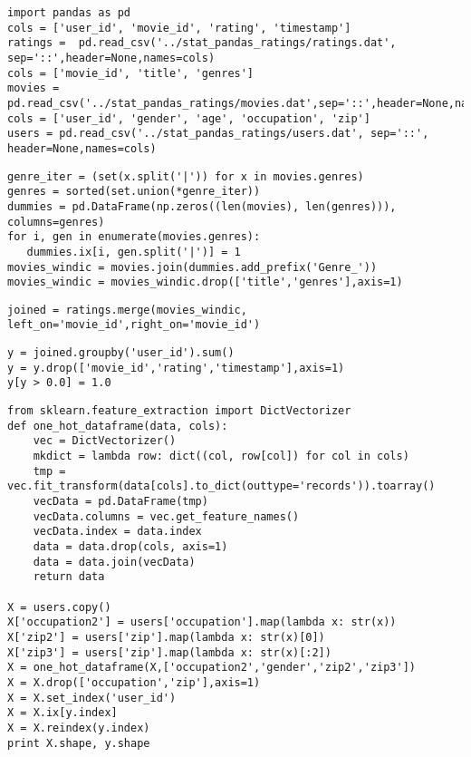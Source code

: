 \documentclass[12pt,fleqn]{article}\usepackage{../common}
\begin{document}
\begin{verbatim}
import pandas as pd
cols = ['user_id', 'movie_id', 'rating', 'timestamp']
ratings =  pd.read_csv('../stat_pandas_ratings/ratings.dat', sep='::',header=None,names=cols)
cols = ['movie_id', 'title', 'genres']
movies =  pd.read_csv('../stat_pandas_ratings/movies.dat',sep='::',header=None,names=cols)
cols = ['user_id', 'gender', 'age', 'occupation', 'zip']
users = pd.read_csv('../stat_pandas_ratings/users.dat', sep='::', header=None,names=cols)
\end{verbatim}

\begin{verbatim}
genre_iter = (set(x.split('|')) for x in movies.genres)
genres = sorted(set.union(*genre_iter))
dummies = pd.DataFrame(np.zeros((len(movies), len(genres))), columns=genres)
for i, gen in enumerate(movies.genres):
   dummies.ix[i, gen.split('|')] = 1
movies_windic = movies.join(dummies.add_prefix('Genre_'))
movies_windic = movies_windic.drop(['title','genres'],axis=1)
\end{verbatim}

\begin{verbatim}
joined = ratings.merge(movies_windic, left_on='movie_id',right_on='movie_id')
\end{verbatim}

\begin{verbatim}
y = joined.groupby('user_id').sum()
y = y.drop(['movie_id','rating','timestamp'],axis=1)
y[y > 0.0] = 1.0
\end{verbatim}

\begin{verbatim}
from sklearn.feature_extraction import DictVectorizer
def one_hot_dataframe(data, cols):
    vec = DictVectorizer()
    mkdict = lambda row: dict((col, row[col]) for col in cols)
    tmp = vec.fit_transform(data[cols].to_dict(outtype='records')).toarray()
    vecData = pd.DataFrame(tmp)
    vecData.columns = vec.get_feature_names()
    vecData.index = data.index
    data = data.drop(cols, axis=1)
    data = data.join(vecData)
    return data

X = users.copy()
X['occupation2'] = users['occupation'].map(lambda x: str(x))
X['zip2'] = users['zip'].map(lambda x: str(x)[0])
X['zip3'] = users['zip'].map(lambda x: str(x)[:2])
X = one_hot_dataframe(X,['occupation2','gender','zip2','zip3'])
X = X.drop(['occupation','zip'],axis=1)
X = X.set_index('user_id')
X = X.ix[y.index]
X = X.reindex(y.index)
print X.shape, y.shape
\end{verbatim}
\end{document}
